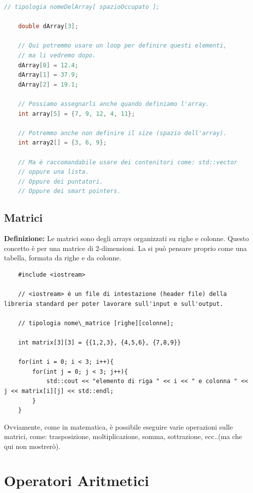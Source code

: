 \begin{lstlisting}[language=C++]
	// tipologia nomeDelArray[ spazioOccupato ];
	
	double dArray[3];
	
	// Qui potremmo usare un loop per definire questi elementi, 
	// ma li vedremo dopo.
	dArray[0] = 12.4;
	dArray[1] = 37.9;
	dArray[2] = 19.1;
	
	// Possiamo assegnarli anche quando definiamo l'array.
	int array[5] = {7, 9, 12, 4, 11};
	
	// Potremmo anche non definire il size (spazio dell'array).
	int array2[] = {3, 6, 9};
	
	// Ma è raccomandabile usare dei contenitori come: std::vector 
	// oppure una lista.
	// Oppure dei puntatori.
	// Oppure dei smart pointers.
\end{lstlisting}

\subsection{Matrici}

\textsf{\small \textbf{Definizione: } Le matrici sono degli arrays organizzati su righe e colonne. Questo concetto è per una matrice di 2-dimensioni. La si può pensare proprio come una tabella, formata da righe e da colonne.} \\

\begin{lstlisting}
	#include <iostream> 
	
	// <iostream> è un file di intestazione (header file) della libreria standard per poter lavorare sull'input e sull'output.
	
	// tipologia nome\_matrice [righe][colonne];
	
	int matrix[3][3] = {{1,2,3}, {4,5,6}, {7,8,9}}
	
	for(int i = 0; i < 3; i++){
		for(int j = 0; j < 3; j++){
			std::cout << "elemento di riga " << i << " e colonna " << j << matrix[i][j] << std::endl;
		}
	}
\end{lstlisting}

\textsf{\small Ovviamente, come in matematica, è possibile eseguire varie operazioni sulle matrici, come: trasposizione, moltiplicazione, somma, sottrazione, ecc..(ma che qui non mostrerò).} \\ 


\section{Operatori Aritmetici}

